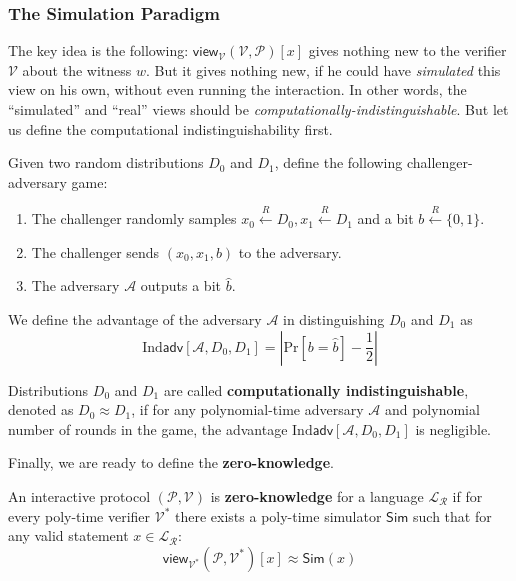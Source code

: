 \documentclass[../lecture-notes-148x210.tex]{subfiles}
\begin{document}
\subsubsection{The Simulation Paradigm}

The key idea is the following: $\mathsf{view}_{\mathcal{V}}(\mathcal{V}, \mathcal{P})[x]$ gives nothing new to the verifier $\mathcal{V}$ about the witness $w$. But it gives nothing new, if he could have \textit{simulated} this view on his own, without even running the interaction. In other words, the ``simulated'' and ``real'' views should be \textit{computationally-indistinguishable}. But let us define the computational indistinguishability first.

\begin{definition}
    Given two random distributions $D_0$ and $D_1$, define the following challenger-adversary game:
    \begin{enumerate}
        \item The challenger randomly samples $x_0 \xleftarrow{R} D_0, x_1 \xleftarrow{R} D_1$ and a bit $b \xleftarrow{R} \{0,1\}$.
        \item The challenger sends $(x_0, x_1, b)$ to the adversary.
        \item The adversary $\mathcal{A}$ outputs a bit $\hat{b}$.
    \end{enumerate}

    We define the advantage of the adversary $\mathcal{A}$ in distinguishing $D_0$ and $D_1$ as 
    \begin{equation*}
        \text{Ind}\textsf{adv}[\mathcal{A}, D_0, D_1] = \left|\text{Pr}[b = \hat{b}] - \frac{1}{2}\right|
    \end{equation*}

    Distributions $D_0$ and $D_1$ are called \textbf{computationally indistinguishable}, denoted as $D_0 \approx D_1$, if for any polynomial-time adversary $\mathcal{A}$ and polynomial number of rounds in the game, the advantage $\text{Ind}\textsf{adv}[\mathcal{A}, D_0, D_1]$ is negligible.
\end{definition}

Finally, we are ready to define the \textbf{zero-knowledge}.

\begin{definition}
    An interactive protocol $(\mathcal{P}, \mathcal{V})$ is \textbf{zero-knowledge} for a language $\mathcal{L}_{\mathcal{R}}$ if for every poly-time verifier $\mathcal{V}^*$ there exists a poly-time simulator $\mathsf{Sim}$ such that for any valid statement $x \in \mathcal{L}_{\mathcal{R}}$:
    \begin{equation*}
        \mathsf{view}_{\mathcal{V}^*}(\mathcal{P}, \mathcal{V}^*)[x] \approx \mathsf{Sim}(x)
    \end{equation*}
\end{definition}
\end{document}
